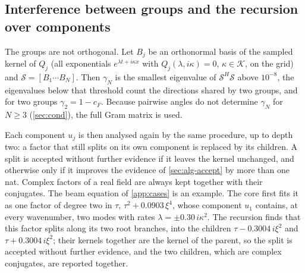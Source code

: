 \documentclass[11pt]{article}
\theoremstyle{plain}
\theoremstyle{definition}
\theoremstyle{remark}
\newcommand{\sumop}{\mathcal{S}}            %
\newcommand{\cF}{c_{F}}                     %
\newcommand{\gN}{\gamma_{N}}                %
\begin{document}
\subsection{Interference between groups and the recursion over components}\label{sec:alg-interference}
The groups are not orthogonal. Let $B_j$ be an orthonormal basis of the sampled kernel of $Q_j$ (all
exponentials $e^{\lambda t+i\kappa x}$ with $Q_j(\lambda,i\kappa)=0$, $\kappa\in\mathcal K$, on the grid) and
$\sumop=[B_1\cdots B_N]$. Then $\gN$ is the smallest eigenvalue of $\sumop^H\sumop$ above $10^{-8}$, the
eigenvalues below that threshold count the directions shared by two groups, and for two groups
$\gamma_2=1-\cF$. Because pairwise angles do not determine $\gN$ for $N\ge3$ (\cref{sec:cond}), the full
Gram matrix is used.

Each component $u_j$ is then analysed again by the same procedure, up to depth two: a factor that still
splits on its own component is replaced by its children. A split is accepted without further evidence
if it leaves the kernel unchanged, and otherwise only if it improves the evidence of \cref{sec:alg-accept} by more
than one nat. Complex factors of a real field are always kept together with their conjugates. The beam equation of
\cref{app:cases} is an example. The core first fits it as one factor of degree two in $\tau$,
$\tau^2+0.0903\,\xi^4$, whose component $u_1$ contains, at every wavenumber, two modes with rates
$\lambda=\pm0.30\,i\kappa^2$. The recursion finds that this factor splits along its two root branches, into the children
$\tau-0.3004\,i\xi^2$ and $\tau+0.3004\,i\xi^2$; their kernels together are the kernel of the parent, so the split is
accepted without further evidence, and the two children, which are complex conjugates, are reported together.
\end{document}

